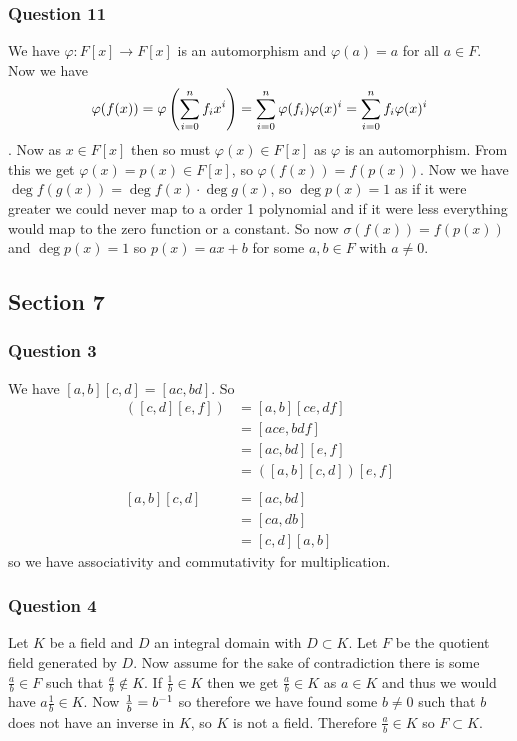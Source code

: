 \documentclass{article}
\begin{document}
\subsubsection{Question 11}

We have $\varphi:F[x]\to F[x]$ is an automorphism and $\varphi(a) = a$ for all $a\in F$. Now we have $$\varphi(f(x)) = \varphi\left(\sum\limits_{i=0}^{n}  {f_ix^i} \right)=\sum\limits_{i=0}^{n}  {\varphi(f_i)\varphi(x)^i}  = \sum\limits_{i=0}^{n}  {f_i\varphi(x)^i} $$. Now as $x\in F[x]$ then so must $\varphi(x) \in F[x]$ as $\varphi$ is an automorphism. From this we get $\varphi(x) = p(x) \in F[x]$, so $\varphi(f(x)) = f(p(x))$. Now we have $\deg f(g(x)) = \deg f(x)\cdot\deg g(x)$, so $\deg p(x) = 1$ as if it were greater we could never map to a order 1 polynomial and if it were less everything would map to the zero function or a constant. So now $\sigma(f(x)) = f(p(x))$ and $\deg p(x) = 1$ so $p(x) = ax+b$ for some $a,b\in F$ with $a\not=0$.

\subsection{Section 7}
\subsubsection{Question 3}
We have $[a,b][c,d] = [ac,bd]$. So \begin{align*}
[a,b]\left([c,d][e,f]\right) &= [a,b][ce,df]\\
&= [ace,bdf] \\
&= [ac,bd][e,f]\\
&=\left([a,b][c,d]\right)[e,f]\\\\
[a,b][c,d] &= [ac,bd]\\
&= [ca,db]\\
&= [c,d][a,b]
\end{align*}
so we have associativity and commutativity for multiplication. 


\subsubsection{Question 4}
Let $K$ be a field and $D$ an integral domain with $D\subset K$. Let $F$ be the quotient field generated by $D$. Now assume for the sake of contradiction there is some $\frac ab \in F$ such that $\frac ab \not\in K$. If $\frac 1b \in K$ then we get $\frac ab\in K$ as $a\in K$ and thus we would have $a\frac 1b \in K$. Now $\frac 1b = {b}^{-1}$ so therefore we have found some $b\not=0$ such that $b$ does not have an inverse in $K$, so $K$ is not a field. Therefore $\frac ab \in K$ so $F\subset K$.
\end{document}
